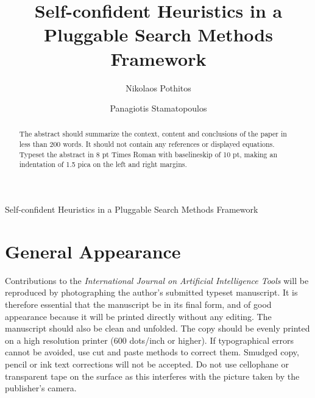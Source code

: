 \documentclass{ws-ijait}
\begin{document}
{Self-confident Heuristics in a Pluggable Search Methods Framework}

%
\catchline{}{}{}{}{}
%

\title{Self-confident Heuristics in a Pluggable Search Methods Framework}

\author{Nikolaos Pothitos}

\address{Department of Informatics and Telecommunications\\
National and Kapodistrian University of Athens\\
Panepistimiopolis, 157\,84 Athens, Greece\\
pothitos@di.uoa.gr}

\author{Panagiotis Stamatopoulos}

\address{takis@di.uoa.gr}

\maketitle

\begin{history}
\end{history}

\begin{abstract}
The abstract should summarize the context, content
and conclusions of the paper in less than 200 words. It should
not contain any references or displayed equations. Typeset the
abstract in 8 pt Times Roman with baselineskip of 10 pt, making
an indentation of 1.5 pica on the left and right margins.
\end{abstract}


\section{General Appearance}

Contributions to the {\it International Journal on Artificial
Intelligence Tools} will be\break
reproduced by photographing the author's submitted typeset
manuscript. It is therefore essential that the manuscript be in its
final form, and of good appearance because it will be printed directly
without any editing. The manuscript should also be clean and
unfolded. The copy should be evenly printed on a high resolution
printer (600 dots/inch or higher).  If typographical errors cannot be
avoided, use cut and paste methods to correct them. Smudged copy,
pencil or ink text corrections will not be accepted. Do not use
cellophane or transparent tape on the surface as this interferes with
the picture taken by the publisher's camera.
\end{document}
